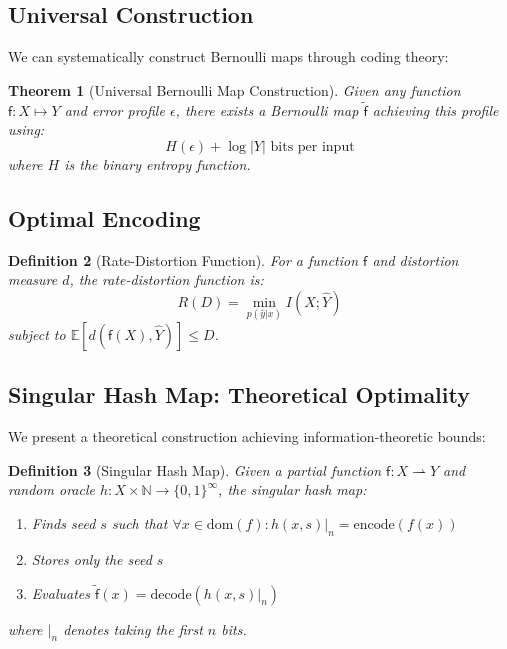 \documentclass[11pt,final,hidelinks]{article}
\newtheorem{theorem}{Theorem}[section]
\newtheorem{definition}[theorem]{Definition}
\newcommand{\obs}[1]{\widetilde{#1}}  %
\newcommand{\Fun}[1]{\mathsf{#1}}     %
\newcommand{\AFun}[1]{\obs{\mathsf{#1}}}  %
\newcommand{\Set}[1]{#1}              %
\newcommand{\Expect}[1]{\mathbb{E}\left[#1\right]}
\newcommand{\error}{\epsilon}
\newcommand{\pfun}{\rightharpoonup}
\begin{document}
\subsection{Universal Construction}

We can systematically construct Bernoulli maps through coding theory:

\begin{theorem}[Universal Bernoulli Map Construction]
Given any function $\Fun{f} : \Set{X} \mapsto \Set{Y}$ and error profile $\error$, there exists a Bernoulli map $\AFun{f}$ achieving this profile using:
\begin{equation}
H(\error) + \log |\Set{Y}| \text{ bits per input}
\end{equation}
where $H$ is the binary entropy function.
\end{theorem}

\subsection{Optimal Encoding}

\begin{definition}[Rate-Distortion Function]
For a function $\Fun{f}$ and distortion measure $d$, the rate-distortion function is:
\begin{equation}
R(D) = \min_{p(\hat{y}|x)} I(X; \hat{Y})
\end{equation}
subject to $\Expect{d(\Fun{f}(X), \hat{Y})} \leq D$.
\end{definition}

\subsection{Singular Hash Map: Theoretical Optimality}

We present a theoretical construction achieving information-theoretic bounds:

\begin{definition}[Singular Hash Map]
Given a partial function $\Fun{f}: \Set{X} \pfun \Set{Y}$ and random oracle $h: \Set{X} \times \mathbb{N} \to \{0,1\}^\infty$, the singular hash map:
\begin{enumerate}
    \item Finds seed $s$ such that $\forall x \in \text{dom}(f): h(x,s)|_n = \text{encode}(f(x))$
    \item Stores only the seed $s$
    \item Evaluates $\AFun{f}(x) = \text{decode}(h(x,s)|_n)$
\end{enumerate}
where $|_n$ denotes taking the first $n$ bits.
\end{definition}
\end{document}
